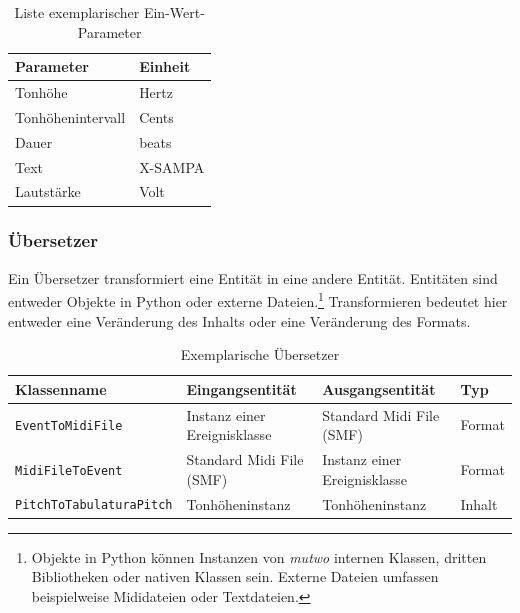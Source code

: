 \documentclass[12pt,a4paper,ngerman]{article}
\begin{document}
\begin{table}[h!]
    \begin{center}
        \begin{tabular}{l l} 
            \hline
            Parameter & Einheit \\ [0.5ex] 
            \hline\hline
            Tonhöhe & Hertz \\ 
            Tonhöhenintervall & Cents \\ 
            Dauer & beats \\ 
            Text & X-SAMPA\footnotemark \\ 
            Lautstärke & Volt \\ [1ex] 
            \hline
        \end{tabular}
    \end{center}

    \caption{Liste exemplarischer Ein-Wert-Parameter}
\end{table}


\subsubsection{Übersetzer}

Ein Übersetzer transformiert eine Entität in eine andere Entität.
Entitäten sind entweder Objekte in Python oder externe Dateien.\footnote{%
    Objekte in Python können Instanzen von \emph{mutwo} internen Klassen, dritten Bibliotheken oder nativen Klassen sein.
    Externe Dateien umfassen beispielweise Mididateien oder Textdateien.
}
Transformieren bedeutet hier entweder eine Veränderung des Inhalts oder eine Veränderung des Formats.


\begin{table}[h!]
    \begin{center}
        \smaller
        \begin{tabular}{l l l l} 
            \hline
            Klassenname & Eingangsentität & Ausgangsentität & Typ \\ [0.5ex] 
            \hline\hline
            \texttt{EventToMidiFile} & Instanz einer Ereignisklasse & Standard Midi File (SMF) & Format \\ 
            \texttt{MidiFileToEvent} & Standard Midi File (SMF) & Instanz einer Ereignisklasse & Format \\ 
            \texttt{PitchToTabulaturaPitch} & Tonhöheninstanz & Tonhöheninstanz & Inhalt \\ [1ex] 
            \hline
        \end{tabular}

    \end{center}
    \caption{Exemplarische Übersetzer}
\end{table}
\end{document}
